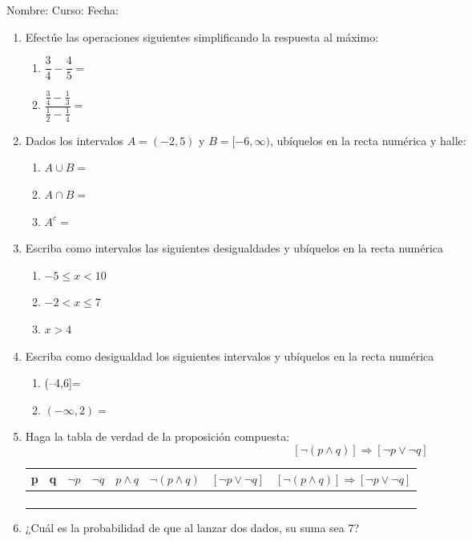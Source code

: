 \documentclass[letterpaper,fleqn]{article}
\newcommand{\LineaNombre}{%
\par
\vspace{\baselineskip}
Nombre:\hrulefill \; Curso: \underline{\hspace*{48pt}} \; Fecha: \underline{\hspace*{2.5cm}} \relax
\par}
\begin{document}
\LineaNombre
\begin{enumerate}
 \item Efectúe las operaciones siguientes simplificando la respuesta al máximo:
 \begin{enumerate}
 \item $\dfrac{3}{4}-\dfrac{4}{5}=$\noanswer
 \item $\dfrac{\frac{3}{4}-\frac{1}{3}}{\frac{1}{2}-\frac{1}{4}}=$\noanswer
 \end{enumerate}
\item Dados los intervalos $A=(-2,5)$ y $B=[-6,\infty)$, ubíquelos en la recta numérica y halle:
\begin{enumerate}
\item $A\cup B=$ \noanswer
\item $A \cap B=$ \noanswer
\item $A^{c}=$ \noanswer
\end{enumerate}
\item Escriba como intervalos las siguientes desigualdades y ubíquelos en la recta numérica
\begin{enumerate}
\item $-5\leq x<10$\noanswer
\item $-2<x \leq7$\noanswer
\item $x>4$\noanswer
\end{enumerate}
\newpage
\item Escriba como desigualdad los siguientes intervalos y ubíquelos en la recta numérica
\begin{enumerate}
\item (--4,6]= \noanswer
\item $(-\infty,2)=$ \noanswer
\end{enumerate}
\item Haga la tabla de verdad de la proposición compuesta:
\[[\neg(p\wedge q)]\Rightarrow [\neg p \vee \neg q]\]
\begin{tabular}{|c|c|c|c|c|c|c|c|}
\hline 
p & q & $\neg p$ & $\neg q$ & $p\wedge q$ & $\neg (p\wedge q)$ & $[\neg p \vee \neg q] $& $[\neg(p\wedge q)]\Rightarrow [\neg p \vee \neg q]$  \\ 
\hline 
 &  &  &  &  &  &  &  \\ 
\hline 
 &  &  &  &  &  &  &  \\ 
\hline 
 &  &  &  &  &  &  &  \\ 
\hline 
 &  &  &  &  &  &  &  \\ 
\hline 
\end{tabular} 
\item ¿Cuál es la probabilidad de que al lanzar dos dados, su suma sea 7?\noanswer
 \end{enumerate}
\end{document}
